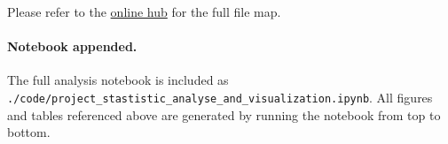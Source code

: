 \documentclass[a4paper,10pt]{article}
\begin{document}
\begin{table}[H]
\centering
\caption{Environment snapshot (for reproducibility).}
\label{tab:env}
\small

\end{table}

\begin{table}[H]
\centering
\caption{Runbook for reproducing all artifacts.}
\label{tab:runbook}
\small

\end{table}

Please refer to the \href{https://github.com/Jincan-LI-HUB/Applied-Statistic-HM1-Project-Report.git}{online hub} for the full file map.

\paragraph{Notebook appended.}
The full analysis notebook is included as \texttt{./code/project\_stastistic\_analyse\_and\_visualization.ipynb}.
All figures and tables referenced above are generated by running the notebook from top to bottom.
\end{document}
